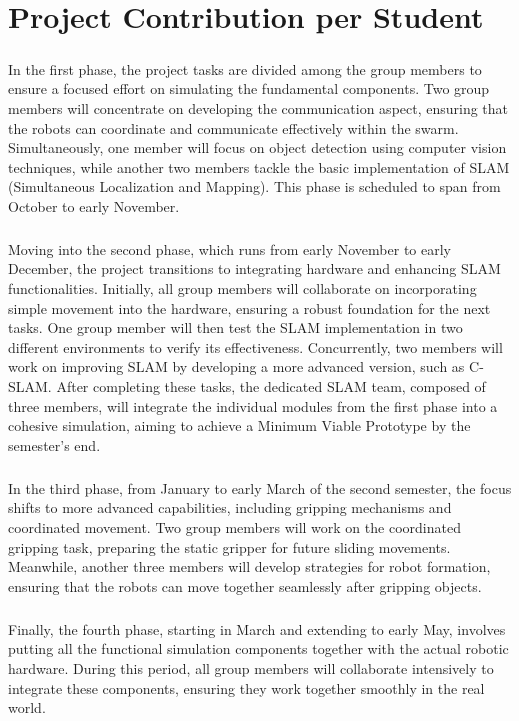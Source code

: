 \chapter{Project Contribution per Student}

\paragraph*{}
In the first phase, the project tasks are divided among the group members to ensure a focused effort on simulating the fundamental components. Two group members will concentrate on developing the communication aspect, ensuring that the robots can coordinate and communicate effectively within the swarm. Simultaneously, one member will focus on object detection using computer vision techniques, while another two members tackle the basic implementation of SLAM (Simultaneous Localization and Mapping). This phase is scheduled to span from October to early November.

\paragraph*{}
Moving into the second phase, which runs from early November to early December, the project transitions to integrating hardware and enhancing SLAM functionalities. Initially, all group members will collaborate on incorporating simple movement into the hardware, ensuring a robust foundation for the next tasks. One group member will then test the SLAM implementation in two different environments to verify its effectiveness. Concurrently, two members will work on improving SLAM by developing a more advanced version, such as C-SLAM. After completing these tasks, the dedicated SLAM team, composed of three members, will integrate the individual modules from the first phase into a cohesive simulation, aiming to achieve a Minimum Viable Prototype by the semester's end.

\paragraph*{}
In the third phase, from January to early March of the second semester, the focus shifts to more advanced capabilities, including gripping mechanisms and coordinated movement. Two group members will work on the coordinated gripping task, preparing the static gripper for future sliding movements. Meanwhile, another three members will develop strategies for robot formation, ensuring that the robots can move together seamlessly after gripping objects.

\paragraph*{}
Finally, the fourth phase, starting in March and extending to early May, involves putting all the functional simulation components together with the actual robotic hardware. During this period, all group members will collaborate intensively to integrate these components, ensuring they work together smoothly in the real world.
